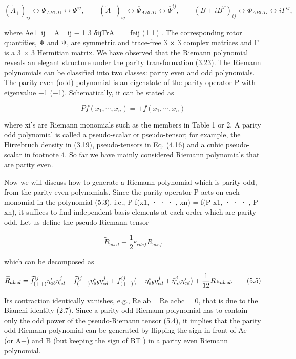 \documentclass{article}
\begin{document}
$$\left(\widetilde{A}_{+}\right)_{ij}\leftrightarrow\Psi_{ABCD}\leftrightarrow\Psi^{ij},\qquad\left(\widetilde{A}_{-}\right)_{ij}\leftrightarrow\overline{\Psi}_{ABCD}\leftrightarrow\overline{\Psi}^{ij},\qquad\left(B+iB^{T}\right)_{ij}\leftrightarrow\Phi_{ABCD}\leftrightarrow i\Gamma^{ij},\tag{5.2}$$

where Ae± ij ≡ A± ij − 1 3 δijTrA± = feij (±±) . The corresponding rotor quantities, Ψ and Ψ, are symmetric and trace-free 3 × 3 complex matrices and Γ is a 3 × 3 Hermitian matrix. We have observed that the Riemann polynomial reveals an elegant structure under the parity transformation (3.23). The Riemann polynomials can be classified into two classes: parity even and odd polynomials. The parity even (odd) polynomial is an eigenstate of the parity operator P with eigenvalue +1 (−1). Schematically, it can be stated as

$$Pf(x_{1},\cdots,x_{n})=\pm f(x_{1},\cdots,x_{n})\tag{5.3}$$

where xi's are Riemann monomials such as the members in Table 1 or 2. A parity odd polynomial is called a pseudo-scalar or pseudo-tensor; for example, the Hirzebruch density in (3.19), pseudo-tensors in Eq. (4.16) and a cubic pseudo-scalar in footnote 4. So far we have mainly considered Riemann polynomials that are parity even.

Now we will discuss how to generate a Riemann polynomial which is parity odd, from the parity even polynomials. Since the parity operator P acts on each monomial in the polynomial (5.3), i.e., P f(x1, · · · , xn) = f(P x1, · · · , P xn), it suffices to find independent basis elements at each order which are parity odd. Let us define the pseudo-Riemann tensor

$$\widetilde{R}_{abcd}\equiv\frac{1}{2}\varepsilon_{cdef}R_{abef}\tag{5.4}$$

which can be decomposed as

$$\widetilde{R}_{abcd}=\widetilde{f}^{ij}_{(++)}\eta^{i}_{ab}\eta^{j}_{cd}-\widetilde{f}^{ij}_{(--)}\eta^{i}_{ab}\eta^{j}_{cd}+f^{ij}_{(+-)}\big{(}-\eta^{i}_{ab}\eta^{j}_{cd}+\bar{\eta}^{j}_{ab}\eta^{i}_{cd}\big{)}+\frac{1}{12}R\,\varepsilon_{abcd}.\tag{5.5}$$

Its contraction identically vanishes, e.g., Re ab ≡ Re acbc = 0, that is due to the Bianchi identity (2.7). Since a parity odd Riemann polynomial has to contain only the odd power of the pseudo-Riemann tensor (5.4), it implies that the parity odd Riemann polynomial can be generated by flipping the sign in front of Ae− (or A−) and B (but keeping the sign of BT ) in a parity even Riemann polynomial.
\end{document}
